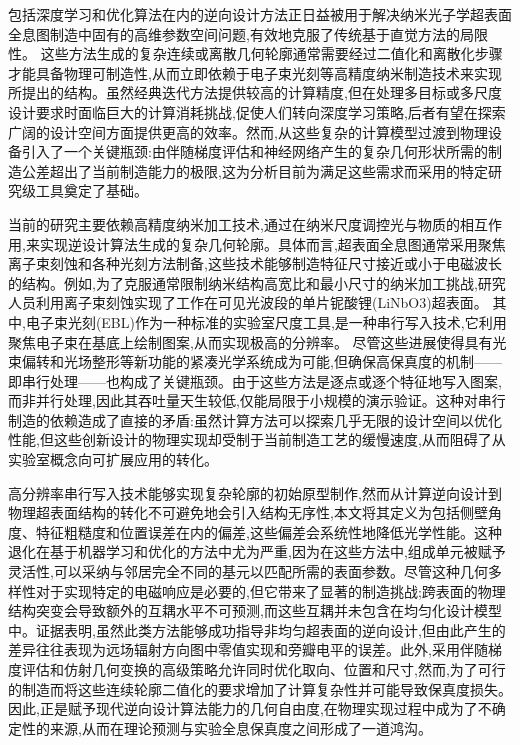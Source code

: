 \documentclass[11pt]{article}
\begin{document}
包括深度学习和优化算法在内的逆向设计方法正日益被用于解决纳米光子学超表面全息图制造中固有的高维参数空间问题,有效地克服了传统基于直觉方法的局限性。\citep{doi_10_1109_metamaterials54993_2022_9920895_1a67346a} 这些方法生成的复杂连续或离散几何轮廓通常需要经过二值化和离散化步骤才能具备物理可制造性,从而立即依赖于电子束光刻等高精度纳米制造技术来实现所提出的结构。虽然经典迭代方法提供较高的计算精度,但在处理多目标或多尺度设计要求时面临巨大的计算消耗挑战,促使人们转向深度学习策略,后者有望在探索广阔的设计空间方面提供更高的效率。然而,从这些复杂的计算模型过渡到物理设备引入了一个关键瓶颈:由伴随梯度评估和神经网络产生的复杂几何形状所需的制造公差超出了当前制造能力的极限,这为分析目前为满足这些需求而采用的特定研究级工具奠定了基础。\citep{doi_10_1088_1361_6439_ad3a72_72d60f33} \citep{doi_10_48550_arxiv_2603_15210_fdcfb92f} \citep{doi_10_1109_metamaterials54993_2022_9920895_1a67346a}

当前的研究主要依赖高精度纳米加工技术,通过在纳米尺度调控光与物质的相互作用,来实现逆设计算法生成的复杂几何轮廓。具体而言,超表面全息图通常采用聚焦离子束刻蚀和各种光刻方法制备,这些技术能够制造特征尺寸接近或小于电磁波长的结构。例如,为了克服通常限制纳米结构高宽比和最小尺寸的纳米加工挑战,研究人员利用离子束刻蚀实现了工作在可见光波段的单片铌酸锂(LiNbO3)超表面。\citep{doi_10_1021_acsphotonics_1c00026_bdd15a92} 其中,电子束光刻(EBL)作为一种标准的实验室尺度工具,是一种串行写入技术,它利用聚焦电子束在基底上绘制图案,从而实现极高的分辨率。\citep{doi_10_1088_1361_6528_ad3c4c_ac8a5241} \citep{doi_10_1021_acsomega_4c01044_0ad8ee05} 尽管这些进展使得具有光束偏转和光场整形等新功能的紧凑光学系统成为可能,但确保高保真度的机制------即串行处理------也构成了关键瓶颈。由于这些方法是逐点或逐个特征地写入图案,而非并行处理,因此其吞吐量天生较低,仅能局限于小规模的演示验证。这种对串行制造的依赖造成了直接的矛盾:虽然计算方法可以探索几乎无限的设计空间以优化性能,但这些创新设计的物理实现却受制于当前制造工艺的缓慢速度,从而阻碍了从实验室概念向可扩展应用的转化。\citep{doi_10_1021_acsphotonics_3c00572_fda8f742} \citep{doi_10_1002_inf2_12116_b5c46838}

高分辨率串行写入技术能够实现复杂轮廓的初始原型制作,然而从计算逆向设计到物理超表面结构的转化不可避免地会引入结构无序性,本文将其定义为包括侧壁角度、特征粗糙度和位置误差在内的偏差,这些偏差会系统性地降低光学性能。这种退化在基于机器学习和优化的方法中尤为严重,因为在这些方法中,组成单元被赋予灵活性,可以采纳与邻居完全不同的基元以匹配所需的表面参数。尽管这种几何多样性对于实现特定的电磁响应是必要的,但它带来了显著的制造挑战;跨表面的物理结构突变会导致额外的互耦水平不可预测,而这些互耦并未包含在均匀化设计模型中。证据表明,虽然此类方法能够成功指导非均匀超表面的逆向设计,但由此产生的差异往往表现为远场辐射方向图中零值实现和旁瓣电平的误差。此外,采用伴随梯度评估和仿射几何变换的高级策略允许同时优化取向、位置和尺寸,然而,为了可行的制造而将这些连续轮廓二值化的要求增加了计算复杂性并可能导致保真度损失。因此,正是赋予现代逆向设计算法能力的几何自由度,在物理实现过程中成为了不确定性的来源,从而在理论预测与实验全息保真度之间形成了一道鸿沟。\citep{doi_10_48550_arxiv_2603_15210_fdcfb92f} \citep{doi_10_1109_tap_2021_3137496_d4a1d597}
\end{document}
